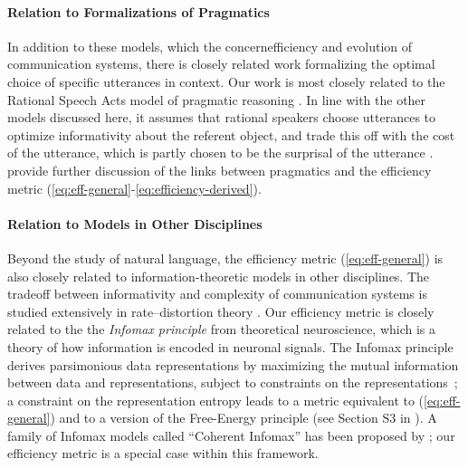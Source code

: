\documentclass[10pt,twoside,lineno]{article}
\begin{document}
\paragraph{Relation to Formalizations of Pragmatics}
In addition to these models, which  the concernefficiency and evolution of communication systems, there is closely related work formalizing the optimal choice of specific utterances in context.
Our work is most closely related to the Rational Speech Acts model of pragmatic reasoning \cite{frank2012predicting,goodman2013knowledge, kao2014nonliteral}.
In line with the other models discussed here, it assumes that rational speakers choose utterances to optimize informativity about the referent object, and trade this off with the cost of the utterance, which is partly chosen to be the surprisal of the utterance \cite{bennett2018extremely, hahn2018information, peloquin2019interactions}.
\citet{peloquin2019interactions} provide further discussion of the links between pragmatics and the efficiency metric (\ref{eq:eff-general}-\ref{eq:efficiency-derived}).

\paragraph{Relation to Models in Other Disciplines}
Beyond the study of natural language, the efficiency metric (\ref{eq:eff-general}) is also closely related to information-theoretic models in other disciplines.
The tradeoff between informativity and complexity of communication systems is studied extensively in rate--distortion theory \cite{berger1971rate}.
Our efficiency metric is closely related to the the \emph{Infomax principle} from theoretical neuroscience, which is a theory of how information is encoded in neuronal signals.
The Infomax principle derives parsimonious data representations by maximizing the mutual information between data and representations, subject to constraints on the representations~\cite{linsker1988self}; a constraint on the representation entropy leads to a metric equivalent to (\ref{eq:eff-general}) and to a version of the Free-Energy principle (see Section S3 in \citet{friston2010free}).
A family of Infomax models called ``Coherent Infomax'' has been proposed by \citet{kay2011coherent}; our efficiency metric is a special case within this framework.


\end{document}
